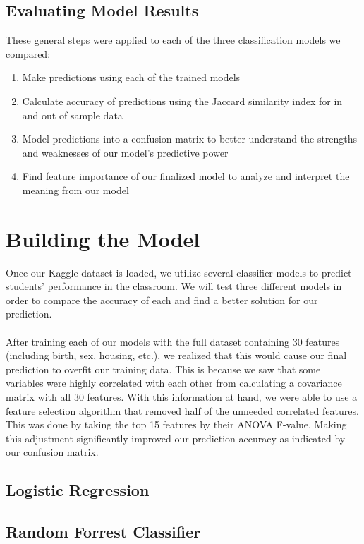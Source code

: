 \documentclass[twoside,twocolumn]{article}
\begin{document}
\subsection{Evaluating Model Results}
These general steps were applied to each of the three classification models we compared:
\begin{enumerate}
	\item Make predictions using each of the trained models
	\item Calculate accuracy of predictions using the Jaccard similarity index for in and out of sample data
	\item Model predictions into a confusion matrix to better understand the strengths and weaknesses of our model’s predictive power
	\item Find feature importance of our finalized model to analyze and interpret the meaning from our model
\end {enumerate}



\section{Building the Model}
Once our Kaggle dataset is loaded, we utilize several classifier models to predict students’ performance in the classroom. We will test three different models in order to compare the accuracy of each and find a better solution for our prediction. 
\\ \\
After training each of our models with the full dataset containing 30 features (including birth, sex, housing, etc.), we realized that this would cause our final prediction to overfit our training data. This is because we saw that some variables were highly correlated with each other from calculating a covariance matrix with all 30 features. With this information at hand, we were able to use a feature selection algorithm that removed half of the unneeded correlated features. This was done by taking the top 15 features by their ANOVA F-value. Making this adjustment significantly improved our prediction accuracy as indicated by our confusion matrix.
\subsection{Logistic Regression}
\subsection{Random Forrest Classifier}
\end{document}
